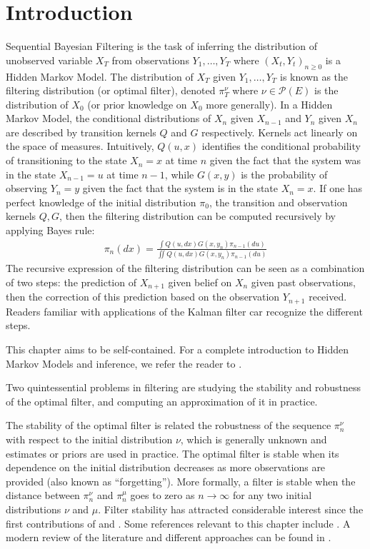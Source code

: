 \section{Introduction}

Sequential Bayesian Filtering is the task of inferring the distribution of unobserved variable $X_T$ from observations $Y_1, \ldots, Y_T$ where $(X_t, Y_t)_{n \geq 0}$ is a Hidden Markov Model. The distribution of $X_T$ given $Y_1, \ldots, Y_T$ is known as the filtering distribution (or optimal filter), denoted $\pi_T^\nu$ where $\nu\in\mathcal P(E)$ is the distribution of $X_0$ (or prior knowledge on $X_0$ more generally). In a Hidden Markov Model, the conditional distributions of $X_n$ given $X_{n-1}$ and $Y_n$ given $X_n$ are described by transition kernels $Q$ and $G$ respectively. Kernels act linearly on the space of measures. Intuitively, $Q(u,x)$ identifies the conditional probability of transitioning to the state $X_{n}=x$ at time $n$ given the fact that the system was in the state $X_{n-1}=u$ at time $n-1$, while $G(x,y)$ is the probability of observing $Y_{n} = y$ given the fact that the system is in the state $X_{n} = x$. If one has perfect knowledge of the initial distribution $\pi_0$, the transition and observation kernels $Q, G$, then the filtering distribution can be computed recursively by applying Bayes rule:
\begin{align}\label{eq:bayes-0}
\pi_n(dx) = \frac{\int Q(u, dx)G(x, y_n)\pi_{n-1}(du)}{\iint Q(u, dx)G(x, y_n)\pi_{n-1}(du)}
\end{align}
The recursive expression of the filtering distribution can be seen as a combination of two steps: the prediction of $X_{n+1}$ given belief on $X_n$ given past observations, then the correction of this prediction based on the observation $Y_{n+1}$ received. Readers familiar with applications of the Kalman filter car recognize the different steps.

This chapter aims to be self-contained. For a complete introduction to Hidden Markov Models and inference, we refer the reader to \cite{cappehmm}.

Two quintessential problems in filtering are studying the stability and robustness of the optimal filter, and computing an approximation of it in practice.

The stability of the optimal filter is related the robustness of the sequence $\pi_n^\nu$ with respect to the initial distribution $\nu$, which is generally unknown and estimates or priors are used in practice. The optimal filter is stable when its dependence on the initial distribution decreases as more observations are provided (also known as ``forgetting''). More formally, a filter is stable when the distance between $\pi_n^\nu$ and $\pi_n^\mu$ goes to zero as $n\to\infty$ for any two initial distributions $\nu$ and $\mu$. Filter stability has attracted considerable interest since the first contributions of \cite{ocone} and \cite{kunita}. Some references relevant to this chapter include \cite{oudjane,mcdonald2020,legland99,decastro2017,mitrophanov-hmm-stability-2005}.
A modern review of the literature and different approaches can be found in \cite{kim2022duality}.

